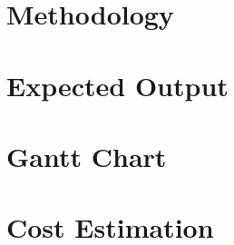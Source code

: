 \documentclass[12pt,a4paper]{report}
\begin{document}
\chapter{Methodology}
\label{methodology}


\chapter{Expected Output}
\label{result}


\chapter*{Gantt Chart}
\label{ganttchart}


\chapter*{Cost Estimation}
\label{cost estimation}


% 
\renewcommand{\bibname}{References}  %



\end{document}

